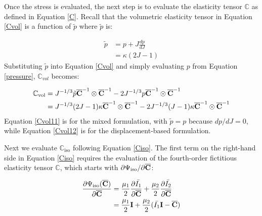Once the stress is evaluated, the next step is to evaluate the elasticity tensor $\mathbb{C}$ as defined in Equation \ref{C}. Recall that the volumetric elasticity tensor in Equation \ref{Cvol} is a function of $\tilde{p}$ where $\tilde{p}$ is:

\begin{equation}
\begin{split}
\tilde{p} &= p + J\frac{dp}{dJ} \\
             &= \kappa{(2J - 1)}
\end{split}
\end{equation}
Substituting $\tilde{p}$ into Equation \ref{Cvol} and simply evaluating $p$ from Equation \ref{pressure}, $\mathbb{C}_{vol}$ becomes:

\begin{subequations} \label{Cvol1}
\begin{align}
\mathbb{C}_\mathrm{vol} &= J^{-1/3}\tilde{p}{\overline{\bold{C}}}^{-1}\otimes{\overline{\bold{C}}}^{-1} - 2J^{-1/3}p{\overline{\bold{C}}}^{-1}\odot{\overline{\bold{C}}}^{-1} \label{Cvol11} \\
&=  J^{-1/3}(2J-1)\kappa \overline{\bold{C}}^{-1} \otimes \overline{\bold{C}}^{-1} - 2J^{-1/3}(J-1)\kappa \overline{\bold{C}}^{-1} \odot \overline{\bold{C}}^{-1} \label{Cvol12}
\end{align}
\end{subequations} 
Equation \ref{Cvol11} is for the mixed formulation, with $\tilde{p} = p$ because $dp/dJ = 0$, while Equation \ref{Cvol12} is for the displacement-based formulation.

Next we evaluate $\mathbb{C}_\mathrm{iso}$ following Equation \ref{Ciso}. The first term on the right-hand side in Equation \ref{Ciso} requires the evaluation of the fourth-order fictitious elasticity tensor $\mathbb{C}$, which starts with ${\partial{\Psi_\mathrm{iso}}}/{\partial{\overline{\bold{C}}}}$:

\begin{equation}
\begin{split}
\frac{\partial{\Psi_\mathrm{iso}(\overline{\bold{C}})}}{\partial{\overline{\bold{C}}}} &= \frac{\mu_1}{2}\frac{\partial{\bar{I_1}}}{\partial{\overline{\bold{C}}}} +  \frac{\mu_2}{2}\frac{\partial{\bar{I_2}}}{\partial{\overline{\bold{C}}}} \\
&= \frac{\mu_1}{2}\bold{I} + \frac{\mu_2}{2}(\bar{I_1}\bold{I} - \overline{\bold{C}})
\end{split}
\end{equation}

